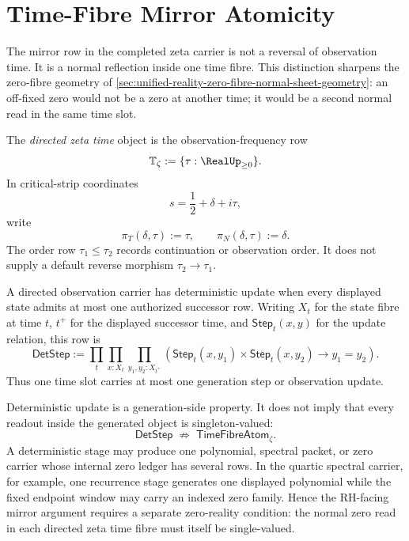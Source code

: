 \section{Time-Fibre Mirror Atomicity}
\label{sec:unified-reality-time-fibre-mirror-atomicity}

The mirror row in the completed zeta carrier is not a reversal of
observation time.  It is a normal reflection inside one time fibre.
This distinction sharpens the zero-fibre geometry of
\autoref{sec:unified-reality-zero-fibre-normal-sheet-geometry}: an
off-fixed zero would not be a zero at another time; it would be a second
normal read in the same time slot.

\begin{definition}
\label{def:unified-reality-directed-zeta-time}
The \emph{directed zeta time} object is the observation-frequency row
$$
\mathbb T_{\zeta}:=\{\tau:\RealUp_{\ge 0}\}.
$$
In critical-strip coordinates
$$
s=\frac12+\delta+i\tau,
$$
write
$$
\pi_T(\delta,\tau):=\tau,
\qquad
\pi_N(\delta,\tau):=\delta.
$$
The order row $\tau_1\le \tau_2$ records continuation or observation
order.  It does not supply a default reverse morphism
$\tau_2\to\tau_1$.
\end{definition}

\begin{definition}
\label{def:unified-reality-deterministic-observation-update}
A directed observation carrier has deterministic update when every
displayed state admits at most one authorized successor row.  Writing
$X_t$ for the state fibre at time $t$, $t^+$ for the displayed successor
time, and $\mathsf{Step}_t(x,y)$ for the update relation, this row is
$$
\mathsf{DetStep}
:=
\prod_t
\prod_{x:X_t}
\prod_{y_1,y_2:X_{t^+}}
\left(
\mathsf{Step}_t(x,y_1)\times\mathsf{Step}_t(x,y_2)
\to
y_1=y_2
\right).
$$
Thus one time slot carries at most one generation step or observation
update.
\end{definition}

\begin{principle}
\label{prin:unified-reality-deterministic-update-weaker-than-zero-fibre-atomicity}
Deterministic update is a generation-side property.  It does not imply
that every readout inside the generated object is singleton-valued:
$$
\mathsf{DetStep}
\;\not\Rightarrow\;
\mathsf{TimeFibreAtom}_{\zeta}.
$$
A deterministic stage may produce one polynomial, spectral packet, or
zero carrier whose internal zero ledger has several rows.  In the
quartic spectral carrier, for example, one recurrence stage generates
one displayed polynomial while the fixed endpoint window may carry an
indexed zero family.  Hence the RH-facing mirror argument requires a
separate zero-reality condition: the normal zero read in each directed
zeta time fibre must itself be single-valued.
\end{principle}

